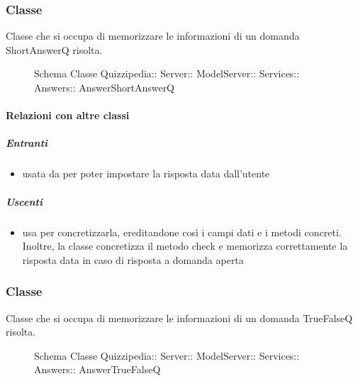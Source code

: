 \subsubsection{Classe }
Classe che si occupa di memorizzare le informazioni di un domanda ShortAnswerQ risolta.
\begin{figure}[H]
\centering
\noindent{}
\caption[Schema Classe AnswerShortAnswerQ]{Schema Classe Quizzipedia:: Server:: ModelServer:: Services:: Answers:: AnswerShortAnswerQ}
\end{figure}
\paragraph{Relazioni con altre classi}
\subparagraph{Entranti}
\begin{itemize}
\item usata da  per poter impostare la risposta data dall'utente
\end{itemize}
\subparagraph{Uscenti}
\begin{itemize}
\item usa  per concretizzarla, ereditandone così i campi dati e i metodi concreti. Inoltre, la classe concretizza il metodo check e memorizza correttamente la risposta data in caso di risposta a domanda aperta
\end{itemize}
\subsubsection{Classe }
Classe che si occupa di memorizzare le informazioni di un domanda TrueFalseQ risolta.
\begin{figure}[H]
\centering
\noindent{}
\caption[Schema Classe AnswerTrueFalseQ]{Schema Classe Quizzipedia:: Server:: ModelServer:: Services:: Answers:: AnswerTrueFalseQ}
\end{figure}
